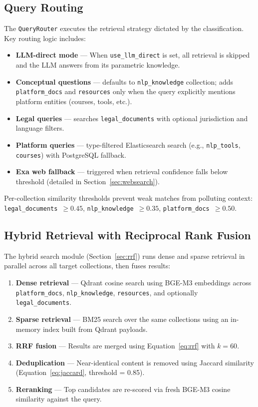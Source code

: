 \documentclass[12pt, a4paper]{article}
\begin{document}
\subsection{Query Routing}

The \texttt{QueryRouter} executes the retrieval strategy dictated by the
classification. Key routing logic includes:

\begin{itemize}[leftmargin=2em]
  \item \textbf{LLM-direct mode} --- When \texttt{use\_llm\_direct} is set,
        all retrieval is skipped and the LLM answers from its parametric
        knowledge.
  \item \textbf{Conceptual questions} --- defaults to
        \texttt{nlp\_knowledge} collection; adds \texttt{platform\_docs}
        and \texttt{resources} only when the query explicitly mentions
        platform entities (courses, tools, etc.).
  \item \textbf{Legal queries} --- searches \texttt{legal\_documents}
        with optional jurisdiction and language filters.
  \item \textbf{Platform queries} --- type-filtered Elasticsearch search
        (e.g., \texttt{nlp\_tools}, \texttt{courses}) with PostgreSQL
        fallback.
  \item \textbf{Exa web fallback} --- triggered when retrieval confidence
        falls below threshold (detailed in Section~\ref{sec:websearch}).
\end{itemize}

Per-collection similarity thresholds prevent weak matches from polluting
context: \texttt{legal\_documents}~$\geq 0.45$,
\texttt{nlp\_knowledge}~$\geq 0.35$,
\texttt{platform\_docs}~$\geq 0.50$.

\subsection{Hybrid Retrieval with Reciprocal Rank Fusion}

The hybrid search module (Section~\ref{sec:rrf}) runs dense and sparse
retrieval in parallel across all target collections, then fuses results:

\begin{enumerate}[leftmargin=2em]
  \item \textbf{Dense retrieval} --- Qdrant cosine search using BGE-M3
        embeddings across \texttt{platform\_docs}, \texttt{nlp\_knowledge},
        \texttt{resources}, and optionally \texttt{legal\_documents}.
  \item \textbf{Sparse retrieval} --- BM25 search over the same collections
        using an in-memory index built from Qdrant payloads.
  \item \textbf{RRF fusion} --- Results are merged using
        Equation~\ref{eq:rrf} with $k = 60$.
  \item \textbf{Deduplication} --- Near-identical content is removed using
        Jaccard similarity (Equation~\ref{eq:jaccard}, threshold = 0.85).
  \item \textbf{Reranking} --- Top candidates are re-scored via fresh
        BGE-M3 cosine similarity against the query.
\end{enumerate}
\end{document}
